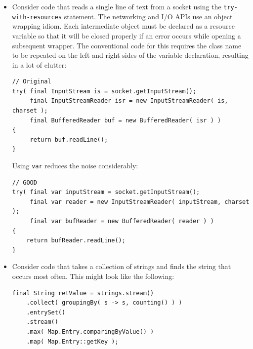 \documentclass[11pt,a4paper, titlepage, parskip=half, headsepline, footsepline, cleardoublepage=current, headheight=1cm]{scrbook}
\begin{document}
\begin{itemize}
\item{Consider code that reads a single line of text from a socket using the \lstinline|try-with-resources| statement. The networking and I/O APIs use an object wrapping idiom. Each intermediate object must be declared as a resource variable so that it will be closed properly if an error occurs while opening a subsequent wrapper. The conventional code for this requires the class name to be repeated on the left and right sides of the variable declaration, resulting in a lot of clutter:
\begin{lstlisting}
// Original
try( final InputStream is = socket.getInputStream();
     final InputStreamReader isr = new InputStreamReader( is, charset );
     final BufferedReader buf = new BufferedReader( isr ) ) 
{
     return buf.readLine();
}
\end{lstlisting}

Using \lstinline|var| reduces the noise considerably:
\begin{lstlisting}
// GOOD
try( final var inputStream = socket.getInputStream();
     final var reader = new InputStreamReader( inputStream, charset );
     final var bufReader = new BufferedReader( reader ) ) 
{
    return bufReader.readLine();
}
\end{lstlisting}}

\item{Consider code that takes a collection of strings and finds the string that occurs most often. This might look like the following:
\begin{lstlisting}
final String retValue = strings.stream()
    .collect( groupingBy( s -> s, counting() ) )
    .entrySet()
    .stream()
    .max( Map.Entry.comparingByValue() )
    .map( Map.Entry::getKey );
\end{lstlisting}

}
\end{itemize}
\end{document}

